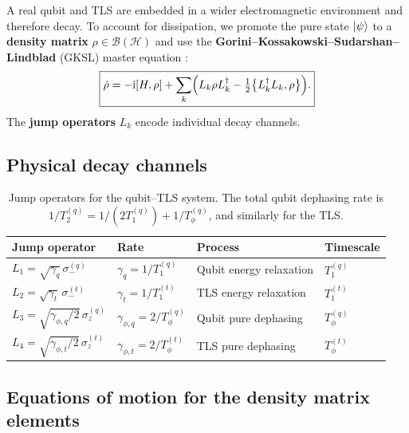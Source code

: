 \documentclass[12pt,a4paper]{article}
\newcommand{\Hil}{\mathcal{H}}
\newcommand{\ii}{\mathrm{i}}
\newcommand{\smq}{\sigma_-^{(q)}}
\newcommand{\smt}{\sigma_-^{(t)}}
\newcommand{\szq}{\sigma_z^{(q)}}
\newcommand{\szt}{\sigma_z^{(t)}}
\begin{document}
A real qubit and TLS are embedded in a wider electromagnetic environment
and therefore decay. To account for dissipation, we promote the pure state
$\ket{\psi}$ to a \textbf{density matrix} $\rho \in \mathcal{B}(\Hil)$
and use the \textbf{Gorini--Kossakowski--Sudarshan--Lindblad} (GKSL) master
equation \cite{Breuer2002,Gardiner2004}:
\begin{equation}
  \boxed{
  \dot\rho = -\ii[H,\rho]
  + \sum_k \Bigl(L_k\rho L_k^\dagger
    - \tfrac{1}{2}\bigl\{L_k^\dagger L_k,\rho\bigr\}\Bigr).
  }
  \label{eq:Lindblad}
\end{equation}
The \textbf{jump operators} $L_k$ encode individual decay channels.

\subsection{Physical decay channels}

\begin{table}[h!]
\centering
\renewcommand{\arraystretch}{1.4}
\begin{tabular}{llll}
\toprule
Jump operator & Rate & Process & Timescale \\
\midrule
$L_1 = \sqrt{\gamma_q}\,\smq$ & $\gamma_q = 1/T_1^{(q)}$ & Qubit energy relaxation & $T_1^{(q)}$ \\
$L_2 = \sqrt{\gamma_t}\,\smt$ & $\gamma_t = 1/T_1^{(t)}$ & TLS energy relaxation & $T_1^{(t)}$ \\
$L_3 = \sqrt{\gamma_{\phi,q}/2}\,\szq$ & $\gamma_{\phi,q} = 2/T_\phi^{(q)}$ & Qubit pure dephasing & $T_\phi^{(q)}$ \\
$L_4 = \sqrt{\gamma_{\phi,t}/2}\,\szt$ & $\gamma_{\phi,t} = 2/T_\phi^{(t)}$ & TLS pure dephasing & $T_\phi^{(t)}$ \\
\bottomrule
\end{tabular}
\caption{Jump operators for the qubit--TLS system. The total qubit
dephasing rate is $1/T_2^{(q)} = 1/(2T_1^{(q)}) + 1/T_\phi^{(q)}$,
and similarly for the TLS.}
\label{tab:jump}
\end{table}

\subsection{Equations of motion for the density matrix elements}
\end{document}
